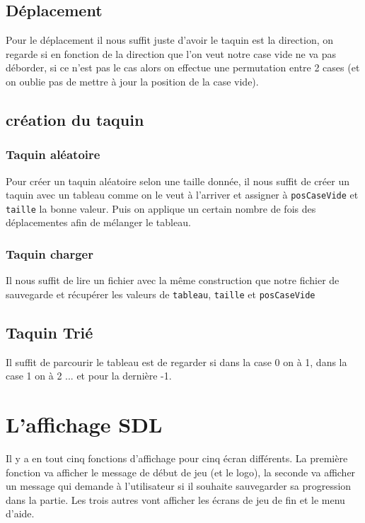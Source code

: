 \documentclass[a4paper]{article}
\begin{document}
\subsection{Déplacement}
\label{subsec:label}

Pour le déplacement il nous suffit juste d'avoir le taquin est la direction, on regarde si en fonction de la direction que l'on veut notre case vide ne va pas déborder, si ce n'est pas le cas alors on effectue une permutation entre 2 cases (et on oublie pas de mettre à jour la position de la case vide).

\subsection{création du taquin}
\label{subsec:creaTaquin}

\subsubsection{Taquin aléatoire}
\label{subsubsec:creaAlea}
Pour créer un taquin aléatoire selon une taille donnée, il nous suffit de créer un taquin avec un tableau comme on le veut à l'arriver et assigner à \texttt{posCaseVide} et \texttt{taille} la bonne valeur. Puis on applique un certain nombre de fois des déplacementes afin de mélanger le tableau. 

\subsubsection{Taquin charger}
\label{subsubsec:charger}
Il nous suffit de lire un fichier avec la même construction que notre fichier de sauvegarde et récupérer les valeurs de \texttt{tableau}, \texttt{taille} et \texttt{posCaseVide}

\subsection{Taquin Trié}
\label{subsec:taquinTrié}

Il suffit de parcourir le tableau est de regarder si dans la case 0 on à 1, dans la case 1 on à 2 ... et pour la dernière -1.




\section{L'affichage SDL}

Il y a en tout cinq fonctions d'affichage pour cinq écran différents. La
première fonction va afficher le message de début de jeu (et le logo), la
seconde va afficher un message qui demande à l’utilisateur si il souhaite
sauvegarder sa progression dans la partie. Les trois autres vont afficher les
écrans de jeu de fin et le menu d'aide.
\end{document}
